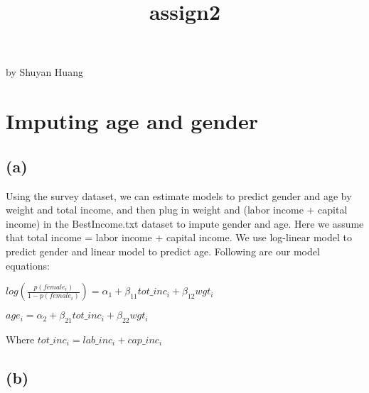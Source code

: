 \documentclass[11pt]{article}
\title{assign2}
\begin{document}
    
    
    \maketitle
    
    

    
    by Shuyan Huang

    \section{Imputing age and gender}\label{imputing-age-and-gender}

    \subsection{(a)}\label{a}

Using the survey dataset, we can estimate models to predict gender and
age by weight and total income, and then plug in weight and (labor
income + capital income) in the BestIncome.txt dataset to impute gender
and age. Here we assume that total income = labor income + capital
income. We use log-linear model to predict gender and linear model to
predict age. Following are our model equations:

\(log(\frac{p(female_i)}{1-p(female_i)}) = \alpha_1 + \beta_{11} tot\_inc_i + \beta_{12} wgt_i\)

\(age_i = \alpha_2 + \beta_{21} tot\_inc_i + \beta_{22} wgt_i\)

Where \(tot\_inc_i = lab\_inc_i+cap\_inc_i\)

\subsection{(b)}\label{b}
\end{document}
